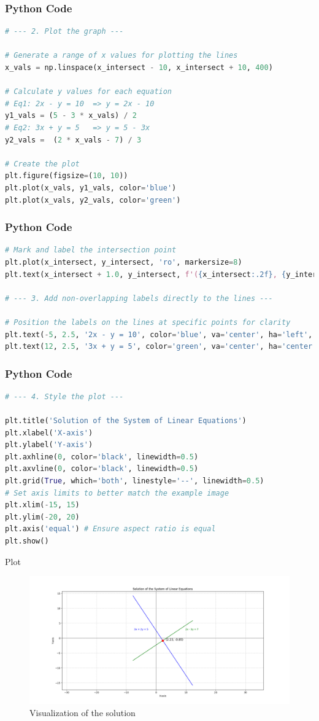 \documentclass{beamer}
\begin{document}
\begin{frame}[fragile]
  \frametitle{Python Code}
  \begin{lstlisting}[language=Python]
# --- 2. Plot the graph ---

# Generate a range of x values for plotting the lines
x_vals = np.linspace(x_intersect - 10, x_intersect + 10, 400)

# Calculate y values for each equation
# Eq1: 2x - y = 10  => y = 2x - 10
y1_vals = (5 - 3 * x_vals) / 2
# Eq2: 3x + y = 5   => y = 5 - 3x
y2_vals =  (2 * x_vals - 7) / 3

# Create the plot
plt.figure(figsize=(10, 10))
plt.plot(x_vals, y1_vals, color='blue')
plt.plot(x_vals, y2_vals, color='green')
   \end{lstlisting}
\end{frame}


\begin{frame}[fragile]
  \frametitle{Python Code}
  \begin{lstlisting}[language=Python]
# Mark and label the intersection point
plt.plot(x_intersect, y_intersect, 'ro', markersize=8)
plt.text(x_intersect + 1.0, y_intersect, f'({x_intersect:.2f}, {y_intersect:.2f})', fontsize=12, va='center')

# --- 3. Add non-overlapping labels directly to the lines ---

# Position the labels on the lines at specific points for clarity
plt.text(-5, 2.5, '2x - y = 10', color='blue', va='center', ha='left', fontsize=11)
plt.text(12, 2.5, '3x + y = 5', color='green', va='center', ha='center', fontsize=11)
   \end{lstlisting}
\end{frame}

\begin{frame}[fragile]
  \frametitle{Python Code}
  \begin{lstlisting}[language=Python]
# --- 4. Style the plot ---

plt.title('Solution of the System of Linear Equations')
plt.xlabel('X-axis')
plt.ylabel('Y-axis')
plt.axhline(0, color='black', linewidth=0.5)
plt.axvline(0, color='black', linewidth=0.5)
plt.grid(True, which='both', linestyle='--', linewidth=0.5)
# Set axis limits to better match the example image
plt.xlim(-15, 15)
plt.ylim(-20, 20)
plt.axis('equal') # Ensure aspect ratio is equal
plt.show()
   \end{lstlisting}
\end{frame}


\begin{frame}{Plot}
  \begin{figure}
    \centering
    \includegraphics[width=\textwidth]{../figs/figure_py.png}
    \caption{Visualization of the solution}
    \label{fig:final_plot}
  \end{figure}
\end{frame}
\end{document}
